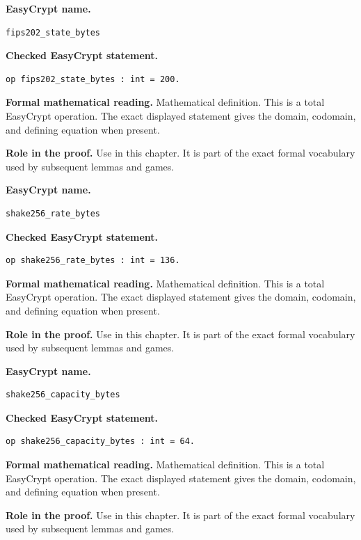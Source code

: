 \begin{formaldefinition}
\noindent\textbf{EasyCrypt name.}
\begin{lstlisting}[language=EasyCrypt,basicstyle=\ttfamily\scriptsize]
fips202_state_bytes
\end{lstlisting}
\noindent\textbf{Checked EasyCrypt statement.}
\begin{lstlisting}[language=EasyCrypt,basicstyle=\ttfamily\scriptsize]
op fips202_state_bytes : int = 200.
\end{lstlisting}
\noindent\textbf{Formal mathematical reading.}
Mathematical definition. This is a total EasyCrypt operation.  The exact displayed statement gives the domain, codomain, and defining equation when present.

\noindent\textbf{Role in the proof.}
Use in this chapter. It is part of the exact formal vocabulary used by subsequent lemmas and games.

\end{formaldefinition}

\begin{formaldefinition}
\noindent\textbf{EasyCrypt name.}
\begin{lstlisting}[language=EasyCrypt,basicstyle=\ttfamily\scriptsize]
shake256_rate_bytes
\end{lstlisting}
\noindent\textbf{Checked EasyCrypt statement.}
\begin{lstlisting}[language=EasyCrypt,basicstyle=\ttfamily\scriptsize]
op shake256_rate_bytes : int = 136.
\end{lstlisting}
\noindent\textbf{Formal mathematical reading.}
Mathematical definition. This is a total EasyCrypt operation.  The exact displayed statement gives the domain, codomain, and defining equation when present.

\noindent\textbf{Role in the proof.}
Use in this chapter. It is part of the exact formal vocabulary used by subsequent lemmas and games.

\end{formaldefinition}

\begin{formaldefinition}
\noindent\textbf{EasyCrypt name.}
\begin{lstlisting}[language=EasyCrypt,basicstyle=\ttfamily\scriptsize]
shake256_capacity_bytes
\end{lstlisting}
\noindent\textbf{Checked EasyCrypt statement.}
\begin{lstlisting}[language=EasyCrypt,basicstyle=\ttfamily\scriptsize]
op shake256_capacity_bytes : int = 64.
\end{lstlisting}
\noindent\textbf{Formal mathematical reading.}
Mathematical definition. This is a total EasyCrypt operation.  The exact displayed statement gives the domain, codomain, and defining equation when present.

\noindent\textbf{Role in the proof.}
Use in this chapter. It is part of the exact formal vocabulary used by subsequent lemmas and games.

\end{formaldefinition}

